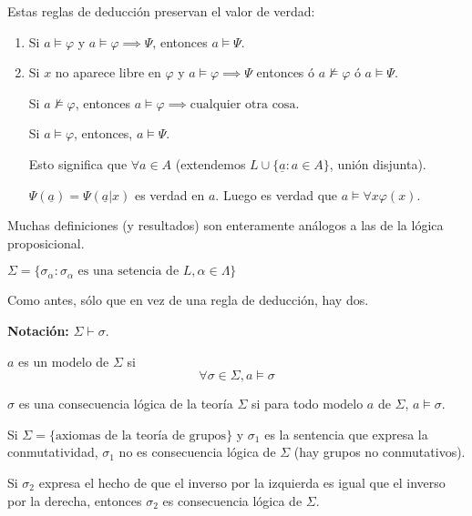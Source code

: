 \begin{obs}
	Estas reglas de deducción preservan el valor de verdad:
	\begin{enumerate}
		\item Si $a\vDash \varphi$ y $a\vDash \varphi\implies\Psi$, entonces $a\vDash \Psi$.
		\item Si $x$ no aparece libre en $\varphi$ y $a\vDash \varphi \implies \Psi$ entonces ó $a\nvDash \varphi$ ó $a\vDash \Psi$. 
		
		Si $a\nvDash \varphi$, entonces $a\vDash \varphi \implies \text{cualquier otra cosa}$. 
		
		Si $a\vDash \varphi$, entonces, $a\vDash \Psi$.
		
		Esto significa que $\forall a\in A$ (extendemos $L\cup\{\underline{a}:a\in A \}$, unión disjunta).
		
		$\Psi (\underline{a}) = \Psi (\underline{a}|x)$ es verdad en $a$. Luego es verdad que $a\vDash \forall x\varphi(x)$.
	\end{enumerate}
\end{obs}

Muchas definiciones (y resultados) son enteramente análogos a las de la lógica proposicional.

\begin{defn}[Teoría]
	$\Sigma = \{\sigma_\alpha : \sigma_\alpha \text{ es una setencia de } L, \alpha \in \Lambda\}$
\end{defn}

\begin{defn}[Prueba]
	Como antes, sólo que en vez de una regla de deducción, hay dos.
	
	\textbf{Notación: } $\Sigma \vdash \sigma$.
\end{defn}

\begin{defn}[Modelo]
	$a$ es un modelo de $\Sigma$ si 
	$$\forall \sigma \in \Sigma, a\vDash \sigma$$
\end{defn}

\begin{defn}
	$\sigma$ es una consecuencia lógica de la teoría $\Sigma$ si para todo modelo $a$ de $\Sigma$, $a\vDash \sigma$. 
\end{defn}

\begin{example}
	Si $\Sigma =\{\text{axiomas de la teoría de grupos}\}$ y $\sigma_1$ es la sentencia que expresa la conmutatividad, $\sigma_1$ no es consecuencia lógica de $\Sigma$ (hay grupos no conmutativos). 

	Si $\sigma_2$ expresa el hecho de que el inverso por la izquierda es igual que el inverso por la derecha, entonces $\sigma_2$ es consecuencia lógica de $\Sigma$.	
\end{example}

